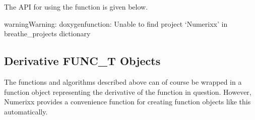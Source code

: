 \documentclass[letterpaper,10pt,english]{sphinxmanual}
\begin{document}
\begin{sphinxVerbatim}[commandchars=\\\{\}]

\PYG{p}{[}\PYG{p}{]}
\PYG{p}{[}\PYG{p}{]}
\end{sphinxVerbatim}

\sphinxAtStartPar
The API for using the  function is given below.

\begin{sphinxadmonition}{warning}{Warning:}
\sphinxAtStartPar
doxygenfunction: Unable to find project ‘Numerixx’ in breathe\_projects dictionary
\end{sphinxadmonition}


\subsection{Derivative FUNC\_T Objects}
\label{\detokenize{docDerivative:derivative-func-t-objects}}
\sphinxAtStartPar
The functions and algorithms described above can of course be wrapped in a function object representing the derivative
of the function in question. However, Numerixx provides a convenience function for creating function objects like this
automatically.
\end{document}
